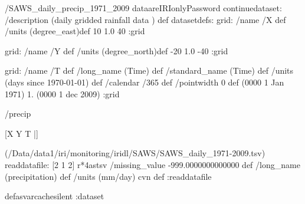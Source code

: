 \begin{ingrid}
/SAWS_daily_precip_1971_2009 dataareIRIonlyPassword
continuedataset:
/description (daily gridded rainfall data ) def
datasetdefs:
grid:
/name /X def
/units (degree_east)def
 10 1.0 40  
:grid

grid:
/name /Y def
/units (degree_north)def
-20 1.0 -40 
:grid

grid:
/name /T def
/long_name (Time) def
 /standard_name (Time) def
/units (days since 1970-01-01) def
/calendar /365 def
/pointwidth 0 def
(0000 1 Jan 1971) 
1.
(0000 1 dec 2009) 
:grid

/precip{
[X Y T |]

(/Data/data1/iri/monitoring/iridl/SAWS/SAWS_daily_1971-2009.tsv)
readdatafile:
[2 1 2] r*4astsv
/missing_value -999.0000000000000 def
/long_name (precipitation) def
/units (mm/day) cvn def
:readdatafile
}defasvarcachesilent
:dataset
\end{ingrid}